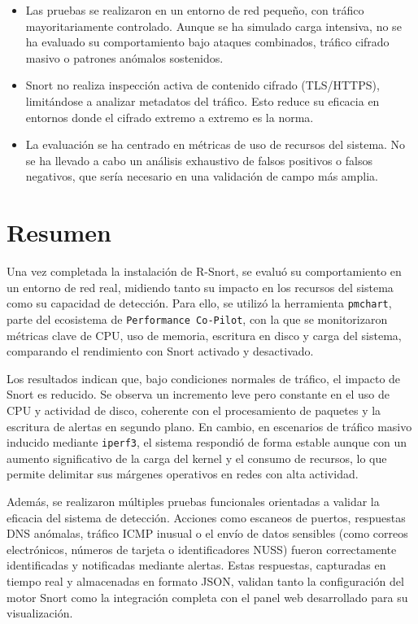 \documentclass[11pt,a4paper,twoside]{report}
\begin{document}
\begin{itemize}
	\item Las pruebas se realizaron en un entorno de red pequeño, con tráfico mayoritariamente controlado. Aunque se ha simulado carga intensiva, no se ha evaluado su comportamiento bajo ataques combinados, tráfico cifrado masivo o patrones anómalos sostenidos.
	\item Snort no realiza inspección activa de contenido cifrado (TLS/HTTPS), limitándose a analizar metadatos del tráfico. Esto reduce su eficacia en entornos donde el cifrado extremo a extremo es la norma.
	\item La evaluación se ha centrado en métricas de uso de recursos del sistema. No se ha llevado a cabo un análisis exhaustivo de falsos positivos o falsos negativos, que sería necesario en una validación de campo más amplia.
\end{itemize}

\pagebreak

\section{Resumen}

Una vez completada la instalación de R-Snort, se evaluó su comportamiento en un entorno de red real, midiendo tanto su impacto en los recursos del sistema como su capacidad de detección. Para ello, se utilizó la herramienta \texttt{pmchart}, parte del ecosistema de \texttt{Performance Co-Pilot}, con la que se monitorizaron métricas clave de CPU, uso de memoria, escritura en disco y carga del sistema, comparando el rendimiento con Snort activado y desactivado.\newline

Los resultados indican que, bajo condiciones normales de tráfico, el impacto de Snort es reducido. Se observa un incremento leve pero constante en el uso de CPU y actividad de disco, coherente con el procesamiento de paquetes y la escritura de alertas en segundo plano. En cambio, en escenarios de tráfico masivo inducido mediante \texttt{iperf3}, el sistema respondió de forma estable aunque con un aumento significativo de la carga del kernel y el consumo de recursos, lo que permite delimitar sus márgenes operativos en redes con alta actividad.\newline

Además, se realizaron múltiples pruebas funcionales orientadas a validar la eficacia del sistema de detección. Acciones como escaneos de puertos, respuestas DNS anómalas, tráfico ICMP inusual o el envío de datos sensibles (como correos electrónicos, números de tarjeta o identificadores NUSS) fueron correctamente identificadas y notificadas mediante alertas. Estas respuestas, capturadas en tiempo real y almacenadas en formato JSON, validan tanto la configuración del motor Snort como la integración completa con el panel web desarrollado para su visualización.\newline
\end{document}
